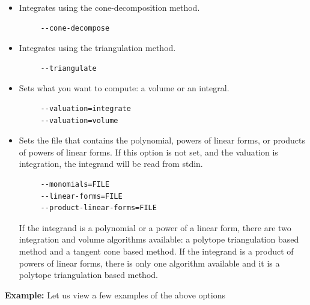 \documentclass{article}
\newcommand{\example}{{\bf Example:\space}}
\begin{document}
\begin{itemize}
\item Integrates using the cone-decomposition method.
        \begin{verbatim}
     --cone-decompose
        \end{verbatim}  
\item Integrates using the triangulation method.
        \begin{verbatim}
     --triangulate
        \end{verbatim}  
\item Sets what you want to compute: a volume or an integral.
        \begin{verbatim}
     --valuation=integrate
     --valuation=volume
        \end{verbatim}  
\item Sets the file that contains the polynomial, powers of linear forms, or products of powers of linear forms. If this option is not set, and the valuation is integration, the integrand will be read from stdin.
        \begin{verbatim}
     --monomials=FILE
     --linear-forms=FILE
     --product-linear-forms=FILE
        \end{verbatim}  
        
        If the integrand is a polynomial or a power of a linear form, there are two integration and volume algorithms available: a polytope triangulation based method and a tangent cone based method. If the integrand is a product of powers of linear forms, there is only one algorithm available and it is a polytope triangulation based method.
\end{itemize}

\example
Let us view a few examples of the above options
\end{document}
